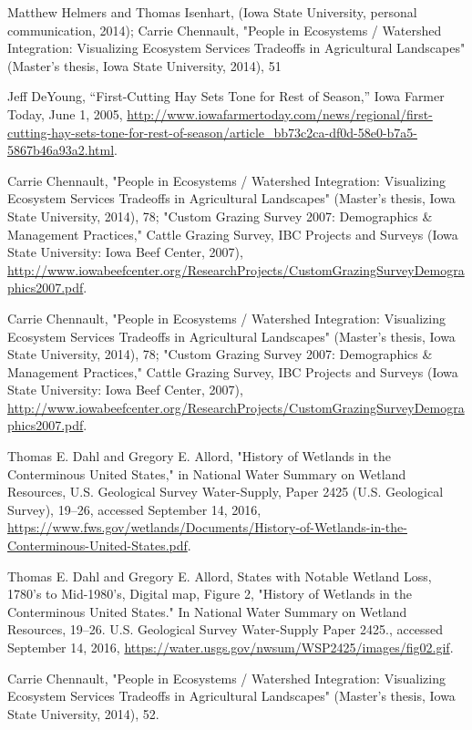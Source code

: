 \documentclass[11pt]{article}
\begin{document}
\begin{thebibliography}{1}
  Matthew Helmers and Thomas Isenhart, (Iowa State University, personal communication, 2014); Carrie Chennault, "People in Ecosystems / Watershed Integration: Visualizing Ecosystem Services Tradeoffs in Agricultural Landscapes" (Master’s thesis, Iowa State University, 2014), 51
  
  Jeff DeYoung, “First-Cutting Hay Sets Tone for Rest of Season,” Iowa Farmer Today, June 1, 2005, \url{http://www.iowafarmertoday.com/news/regional/first-cutting-hay-sets-tone-for-rest-of-season/article_bb73c2ca-df0d-58e0-b7a5-5867b46a93a2.html}.
  
Carrie Chennault, "People in Ecosystems / Watershed Integration: Visualizing Ecosystem Services Tradeoffs in Agricultural Landscapes" (Master’s thesis, Iowa State University, 2014), 78; "Custom Grazing Survey 2007: Demographics \& Management Practices," Cattle Grazing Survey, IBC Projects and Surveys (Iowa State University: Iowa Beef Center, 2007), \url{http://www.iowabeefcenter.org/ResearchProjects/CustomGrazingSurveyDemographics2007.pdf}.
  
  Carrie Chennault, "People in Ecosystems / Watershed Integration: Visualizing Ecosystem Services Tradeoffs in Agricultural Landscapes" (Master’s thesis, Iowa State University, 2014), 78; "Custom Grazing Survey 2007: Demographics \& Management Practices," Cattle Grazing Survey, IBC Projects and Surveys (Iowa State University: Iowa Beef Center, 2007), \url{http://www.iowabeefcenter.org/ResearchProjects/CustomGrazingSurveyDemographics2007.pdf}.
  
  
  Thomas E. Dahl and Gregory E. Allord, "History of Wetlands in the Conterminous United States," in National Water Summary on Wetland Resources, U.S. Geological Survey Water-Supply, Paper 2425 (U.S. Geological Survey), 19–26, accessed September 14, 2016, \url{https://www.fws.gov/wetlands/Documents/History-of-Wetlands-in-the-Conterminous-United-States.pdf}.
  
  Thomas E. Dahl and Gregory E. Allord, States with Notable Wetland Loss, 1780’s to Mid-1980’s, Digital map, Figure 2, "History of Wetlands in the Conterminous United States." In National Water Summary on Wetland Resources, 19–26. U.S. Geological Survey Water-Supply Paper 2425., accessed September 14, 2016, \url{https://water.usgs.gov/nwsum/WSP2425/images/fig02.gif}.
  
  Carrie Chennault, "People in Ecosystems / Watershed Integration: Visualizing Ecosystem Services Tradeoffs in Agricultural Landscapes" (Master’s thesis, Iowa State University, 2014), 52.
  

\end{thebibliography}
\end{document}
